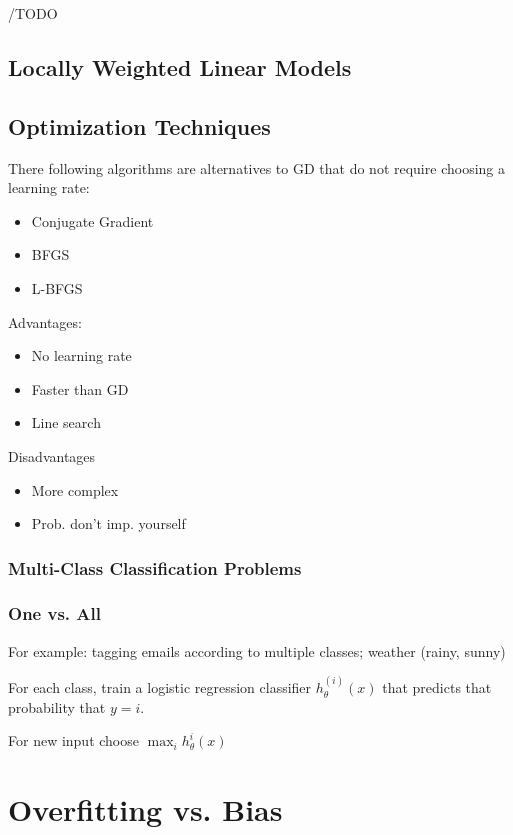 /TODO

\subsection{Locally Weighted Linear Models}

\subsection{Optimization Techniques}

There following algorithms are alternatives to GD that do not require choosing a learning rate:

\begin{itemize}
\item Conjugate Gradient
\item BFGS
\item L-BFGS
\end{itemize}

Advantages:
\begin{itemize}
\item No learning rate
\item Faster than GD
\item Line search
\end{itemize}

Disadvantages
\begin{itemize}
\item More complex
\item Prob. don't imp. yourself
\end{itemize}

\subsubsection{Multi-Class Classification Problems}

\subsubsection{One vs. All}

For example: tagging emails according to multiple classes; weather (rainy, sunny)

For each class, train a logistic regression classifier $h_{\theta}^{(i)}(x)$ that predicts that probability that $y=i$.

For new input choose $\max_ih_\theta^i(x)$

\section{ Overfitting vs. Bias}

